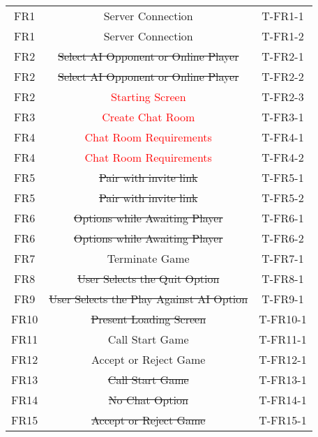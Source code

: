 \documentclass[12pt, titlepage]{article}
\begin{document}
\begin{center}
\begin{longtable}{ |c|c|c| }
        \hline
        FR1     & Server Connection                     & T-FR1-1 \\ 
        FR1     & Server Connection                     & T-FR1-2 \\ 
        \hline
        FR2     & \sout{Select AI Opponent or Online Player} & T-FR2-1 \\ 
        FR2     & \sout{Select AI Opponent or Online Player} & T-FR2-2 \\ 
        FR2     & \textcolor{red}{Starting Screen}   & T-FR2-3 \\ 
        \hline
        FR3     &   \textcolor{red}{Create Chat Room}                & T-FR3-1 \\ 
        \hline
        FR4     &  \textcolor{red}{Chat Room Requirements}          & T-FR4-1 \\ 
        FR4     &  \textcolor{red}{Chat Room Requirements}        & T-FR4-2 \\ 
        \hline
        FR5     & \sout{Pair with invite link}                        & T-FR5-1 \\ 
        FR5     & \sout{Pair with invite link}                        & T-FR5-2 \\ 
        \hline
        FR6     & \sout{Options while Awaiting Player}                   & T-FR6-1 \\
        FR6     & \sout{Options while Awaiting Player}                   & T-FR6-2 \\ 
        \hline
        FR7     &  Terminate Game                     & T-FR7-1 \\ 
        \hline
        FR8     & \sout{User Selects the Quit Option}                & T-FR8-1 \\ 
        \hline
        FR9     & \sout{User Selects the Play Against AI Option}                       & T-FR9-1 \\ 
        \hline
        FR10    & \sout{Present Loading Screen}                 & T-FR10-1 \\ 
        \hline
        FR11    & Call Start Game                       & T-FR11-1 \\ 
        \hline
        FR12    & Accept or Reject Game                         & T-FR12-1 \\ 
        \hline
        FR13    & \sout{Call Start Game}                 & T-FR13-1 \\ 
        \hline
        FR14    & \sout{No Chat Option}              & T-FR14-1 \\ 
        \hline
        FR15    & \sout{Accept or Reject Game}            & T-FR15-1 \\ 

\end{longtable}
\end{center}
\end{document}

